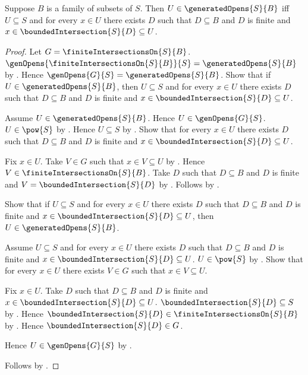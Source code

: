 \begin{theorem}\label{generated_opens_iff_finite_intersections}
    Suppose $B$ is a family of subsets of $S$.
    Then $U\in\generatedOpens{S}{B}$ iff
        $U\subseteq S$ and for every $x\in U$ there exists $D$ such that
            $D\subseteq B$ and $D$ is finite and
            $x\in\boundedIntersection{S}{D}\subseteq U$.
\end{theorem}
\begin{proof}
    Let $G=\finiteIntersectionsOn{S}{B}$.
    $\genOpens{\finiteIntersectionsOn{S}{B}}{S}
        =\generatedOpens{S}{B}$ by
        .
    Hence $\genOpens{G}{S}=\generatedOpens{S}{B}$.
    Show that if $U\in\generatedOpens{S}{B}$, then
        $U\subseteq S$ and for every $x\in U$ there exists $D$ such that
            $D\subseteq B$ and $D$ is finite and
            $x\in\boundedIntersection{S}{D}\subseteq U$.
    \begin{subproof}
        Assume $U\in\generatedOpens{S}{B}$.
        Hence $U\in\genOpens{G}{S}$.
        $U\in\pow{S}$ by .
        Hence $U\subseteq S$ by .
        Show that for every $x\in U$ there exists $D$ such that
            $D\subseteq B$ and $D$ is finite and
            $x\in\boundedIntersection{S}{D}\subseteq U$.
        \begin{subproof}
            Fix $x\in U$.
            Take $V\in G$ such that $x\in V\subseteq U$ by
                .
            Hence $V\in\finiteIntersectionsOn{S}{B}$.
            Take $D$ such that $D\subseteq B$ and $D$ is finite and
                $V=\boundedIntersection{S}{D}$ by
                .
            Follows by \auto.
        \end{subproof}
    \end{subproof}
    Show that if $U\subseteq S$ and for every $x\in U$ there exists $D$
        such that $D\subseteq B$ and $D$ is finite and
            $x\in\boundedIntersection{S}{D}\subseteq U$, then
        $U\in\generatedOpens{S}{B}$.
    \begin{subproof}
        Assume $U\subseteq S$ and for every $x\in U$ there exists $D$
            such that $D\subseteq B$ and $D$ is finite and
                $x\in\boundedIntersection{S}{D}\subseteq U$.
        $U\in\pow{S}$ by .
        Show that for every $x\in U$ there exists $V\in G$ such that
            $x\in V\subseteq U$.
        \begin{subproof}
            Fix $x\in U$.
            Take $D$ such that $D\subseteq B$ and $D$ is finite and
                $x\in\boundedIntersection{S}{D}\subseteq U$.
            $\boundedIntersection{S}{D}\subseteq S$ by
                .
            Hence $\boundedIntersection{S}{D}
                \in\finiteIntersectionsOn{S}{B}$ by
                .
            Hence $\boundedIntersection{S}{D}\in G$.
        \end{subproof}
        Hence $U\in\genOpens{G}{S}$ by .
    \end{subproof}
    Follows by \auto.
\end{proof}

